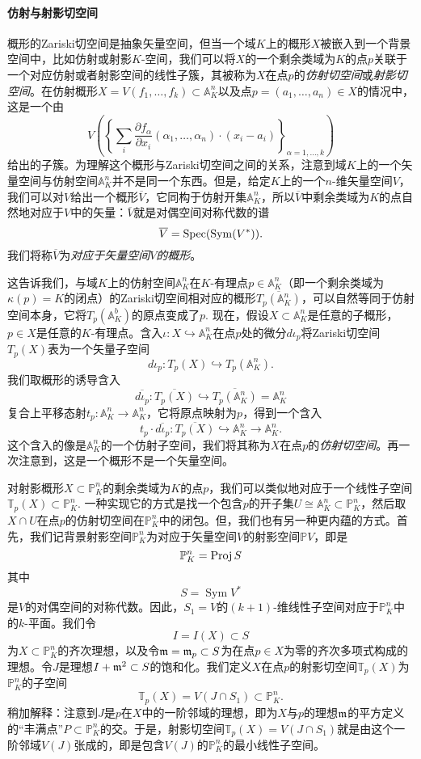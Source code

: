 \paragraph*{仿射与射影切空间}
概形的Zariski切空间是抽象矢量空间，但当一个域$K$上的概形$X$被嵌入到一个背景空间中，比如仿射或射影$K$-空间，我们可以将$X$的一个剩余类域为$K$的点$p$关联于一个对应仿射或者射影空间的线性子簇，其被称为$X$在点$p$的\textit{仿射切空间}或\textit{射影切空间}。在仿射概形$X=V(f_1,\dots,f_k)\subset \mathbb A_K^n$以及点$p=(a_1,\dots,a_n)\in X$的情况中，这是一个由
\[
	V\left(\left\{
		\sum_i \frac{\partial f_\alpha}{\partial x_i}(\alpha_1,\dots,\alpha_n)\cdot (x_i-a_i)
	\right\}_{\alpha=1,\dots,k}
	\right)
\]
给出的子簇。为理解这个概形与Zariski切空间之间的关系，注意到域$K$上的一个矢量空间与仿射空间$\mathbb A_K^n$并不是同一个东西。但是，给定$K$上的一个$n$-维矢量空间$V$，我们可以对$V$给出一个概形$\overline{V}$，它同构于仿射开集$\mathbb A_K^n$，所以$\overline{V}$中剩余类域为$K$的点自然地对应于$V$中的矢量：$\overline{V}$就是对偶空间对称代数的谱
\[
	\overline{V}=\operatorname{Spec} (\operatorname{Sym}(V^*)).
\]
我们将称$\overline{V}$为\textit{对应于矢量空间$V$的概形}。

这告诉我们，与域$K$上的仿射空间$\mathbb A_K^n$在$K$-有理点$p\in \mathbb A^n_K$（即一个剩余类域为$\kappa(p)=K$的闭点）的Zariski切空间相对应的概形$\overline{T_p(\mathbb A^n_K)}$，可以自然等同于仿射空间本身，它将$T_p(\mathbb A_K^b)$的原点变成了$p$. 现在，假设$X\subset \mathbb A_K^n$是任意的子概形，$p\in X$是任意的$K$-有理点。含入$\iota:X\hookrightarrow \mathbb A_K^n$在点$p$处的微分$d\iota_p$将Zariski切空间$T_p(X)$表为一个矢量子空间
\[
	d\iota_p:T_p(X)\hookrightarrow T_p(\mathbb A_K^n).
\]
我们取概形的诱导含入
\[
	\overline{d\iota_p}:\overline{T_p(X)}\hookrightarrow
	\overline{T_p(\mathbb A_K^n)}=\mathbb A_K^n
\]
复合上平移态射$t_p:\mathbb A^n_K\to \mathbb A^n_K$，它将原点映射为$p$，得到一个含入
\[
	t_p\cdot \overline{d\iota_p}:\overline{T_p(X)}\hookrightarrow
	\mathbb A_K^n \longrightarrow \mathbb A_K^n.
\]
这个含入的像是$\mathbb A_K^n$的一个仿射子空间，我们将其称为$X$在点$p$的\textit{仿射切空间}。再一次注意到，这是一个概形不是一个矢量空间。

对射影概形$X\subset \mathbb P_K^n$的剩余类域为$K$的点$p$，我们可以类似地对应于一个线性子空间$\mathbb T_p(X)\subset \mathbb P_K^n$. 一种实现它的方式是找一个包含$p$的开子集$U\cong \mathbb A_K^n\subset \mathbb P^n_K$，然后取$X\cap U$在点$p$的仿射切空间在$\mathbb P_K^n$中的闭包。但，我们也有另一种更内蕴的方式。首先，我们记背景射影空间$\mathbb P_K^n$为对应于矢量空间$V$的射影空间$\mathbb PV$，即是
\[
	\mathbb P_K^n=\operatorname{Proj} S
\]
其中
\[
	S=\operatorname{Sym}V^*
\]
是$V$的对偶空间的对称代数。因此，$S_1=V$的$(k+1)$-维线性子空间对应于$\mathbb P_K^n$中的$k$-平面。我们令
\[
	I=I(X)\subset S
\]
为$X\subset \mathbb P_K^n$的齐次理想，以及令$\mathfrak{m}=\mathfrak{m}_p\subset S$为在点$p\in X$为零的齐次多项式构成的理想。令$J$是理想$I+\mathfrak{m}^2\subset S$的饱和化。我们定义$X$在点$p$的射影切空间$\mathbb T_p(X)$为$\mathbb P_K^n$的子空间
\[
	\mathbb T_p (X)=V(J\cap S_1)\subset \mathbb P^n_K.
\]
稍加解释：注意到$J$是$p$在$X$中的一阶邻域的理想，即为$X$与$p$的理想$\mathfrak{m}$的平方定义的“丰满点”$P\subset \mathbb P_K^n$的交。于是，射影切空间$\mathbb T_p(X)=V(J\cap S_1)$就是由这个一阶邻域$V(J)$张成的，即是包含$V(J)$的$\mathbb P_K^n$的最小线性子空间。

